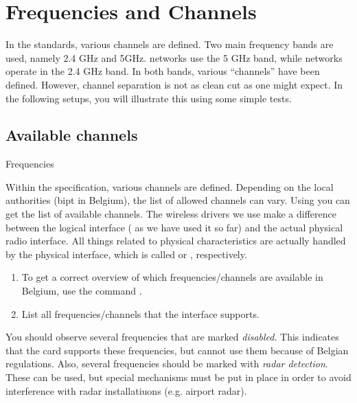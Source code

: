 \setcounter{chapter}{1}
\chapter{Frequencies and Channels}

In the \wifi standards, various channels are defined. Two main frequency bands are used, namely 2.4 GHz and 5GHz.  networks use the 5 GHz band, while  networks operate in the 2.4 GHz band. In both bands, various ``channels'' have been defined. However, channel separation is not as clean cut as one might expect. In the following setups, you will illustrate this using some simple tests.

\section{Available channels}
\begin{exercise}{Frequencies}

Within the \wifi specification, various channels are defined. Depending on the local authorities (\ac{bipt} in Belgium\cite{bipt}), the list of allowed channels can vary. Using  you can get the list of available channels.\newline
\remark The wireless drivers we use make a difference between the logical interface ( as we have used it so far) and the actual physical radio interface. All things related to physical characteristics are actually handled by the physical interface, which is called  or , respectively.\newline
\begin{enumerate}
	\item  To get a correct overview of which frequencies/channels are available in Belgium, use the command .
	\item List all frequencies/channels that the  interface supports.\newline
	\begin{esolution}
	\end{esolution}
\end{enumerate}

You should observe several frequencies that are marked \emph{disabled}. This indicates that the card supports these frequencies, but cannot use them because of Belgian regulations. Also, several frequencies should be marked with \emph{radar detection}. These can be used, but special mechanisms must be put in place in order to avoid interference with radar installatiuons (e.g. airport radar).

\end{exercise}

